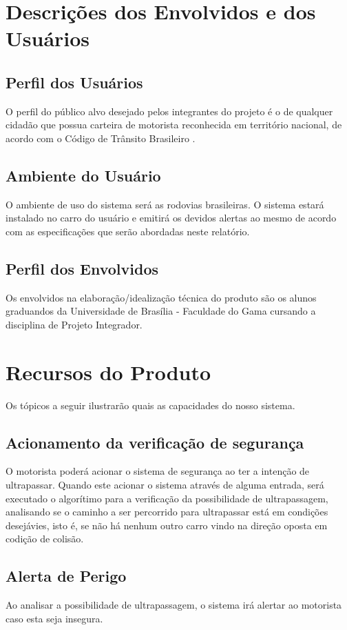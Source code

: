 \section{Descrições dos Envolvidos e dos Usuários}

\subsection{Perfil dos Usuários}
O perfil do público alvo desejado pelos integrantes do projeto é o de qualquer cidadão que possua carteira de motorista reconhecida em território nacional, de acordo com o Código de Trânsito Brasileiro \cite{ctb}.

\subsection{Ambiente do Usuário}
O ambiente de uso do sistema será as rodovias brasileiras. O sistema estará instalado no carro do usuário e emitirá os devidos alertas ao mesmo de acordo com as especificações que serão abordadas neste relatório.

\subsection{Perfil dos Envolvidos}
Os envolvidos na elaboração/idealização técnica do produto são os alunos graduandos da Universidade de Brasília - Faculdade do Gama cursando a disciplina de Projeto Integrador.

\section{Recursos do Produto}
Os tópicos a seguir ilustrarão quais as capacidades do nosso sistema.
\subsection{Acionamento da verificação de segurança}
O motorista poderá acionar o sistema de segurança ao ter a intenção de ultrapassar.
Quando este acionar o sistema através de alguma entrada, será executado o algorítimo para a verificação da possibilidade de
ultrapassagem, analisando se o caminho a ser percorrido para ultrapassar está em condições desejávies, isto é,
se não há nenhum outro carro vindo na direção oposta em codição de colisão.

\subsection{Alerta de Perigo}
Ao analisar a possibilidade de ultrapassagem, o sistema irá alertar ao motorista caso esta seja insegura.

